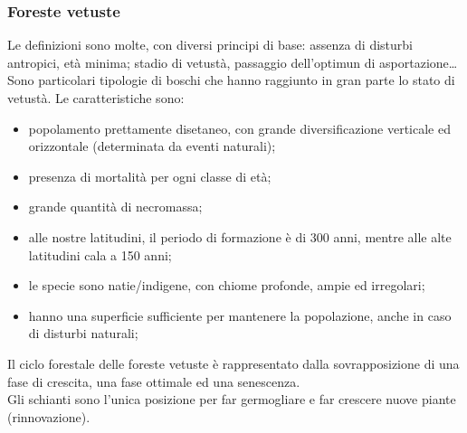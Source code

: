 \documentclass{article}
\begin{document}
\subsubsection{Foreste vetuste}
Le definizioni sono molte, con diversi principi di base: assenza di disturbi antropici, età minima; stadio di vetustà, passaggio dell'optimun di asportazione\dots
Sono particolari tipologie di boschi che hanno raggiunto in gran parte lo stato di vetustà. 
Le caratteristiche sono:
\begin{itemize}
    \item popolamento prettamente disetaneo, con grande diversificazione verticale ed orizzontale (determinata da eventi naturali);
    \item  presenza di mortalità per ogni classe di età;
    \item grande quantità di necromassa;
    \item alle nostre latitudini, il periodo di formazione è di 300 anni, mentre alle alte latitudini cala a 150 anni;
    \item le specie sono natie/indigene, con chiome profonde, ampie ed irregolari;
    \item hanno una superficie sufficiente per mantenere la popolazione, anche in caso di disturbi naturali;
\end{itemize}
Il ciclo forestale delle foreste vetuste è rappresentato dalla sovrapposizione di una fase di crescita, una fase ottimale ed una senescenza.\\
Gli schianti sono l'unica posizione per far germogliare e far crescere nuove piante (rinnovazione).
\end{document}
